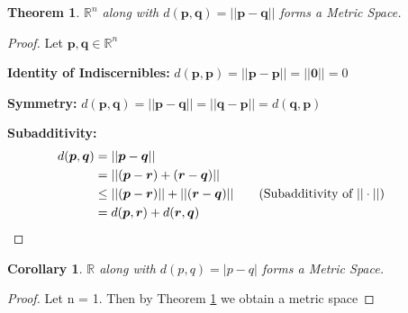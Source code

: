\documentclass{article}
\newtheorem{theorem}{Theorem}[section]
\newtheorem{corollary}{Corollary}[theorem]
\begin{document}
			\begin{theorem}
			\label{euclidean metric space}
				$\mathbb{R}^n$ along with $d(\bm{p},\bm{q}) = ||\bm{p}-\bm{q}||$ forms a Metric Space.
			\end{theorem}
			\begin{proof}
				Let $\bm{p}, \bm{q} \in \mathbb{R}^n$ 
				\item \textbf{Identity of Indiscernibles:} $d(\bm{p},\bm{p}) = ||\bm{p}-\bm{p}|| = ||\bm{0}|| = 0$
				\item \textbf{Symmetry:} $d(\bm{p},\bm{q}) = ||\bm{p}-\bm{q}|| = ||\bm{q}-\bm{p}|| = d(\bm{q},\bm{p})$
				\item \textbf{Subadditivity:}
				\begin{align*}
					d(\bm{p},\bm{q}) &= ||\bm{p}-\bm{q}||\\
									 &= ||(\bm{p}-\bm{r}) + (\bm{r}-\bm{q})||\\
									 &\leq ||(\bm{p}-\bm{r})|| + ||(\bm{r}-\bm{q})|| \tag{Subadditivity of $||\cdot||$}\\
									 &= d(\bm{p},\bm{r}) + d(\bm{r},\bm{q}) &&\qedhere
				\end{align*}
			\end{proof}

			\begin{corollary}
				$\mathbb{R}$ along with $d(p, q) = |p - q|$ forms a Metric Space.
			\end{corollary}
			\begin{proof}
				Let n = 1. Then by Theorem \ref{euclidean metric space} we obtain a metric space
			\end{proof}
\end{document}

